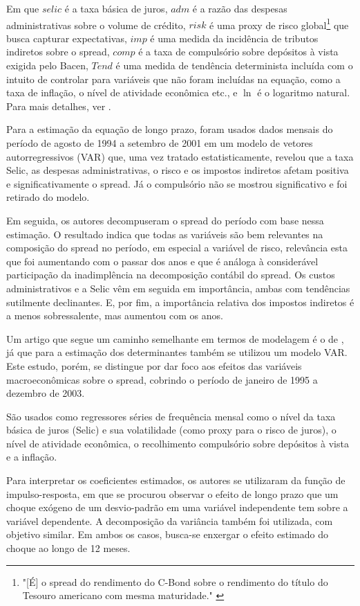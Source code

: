 \documentclass[a4paper,
               article,
               12pt,
               openany,
               oneside,
               english,
               brazil]{abntex2}
\numberwithin{equation}{section}
\begin{document}
    Em que $ selic $ é a taxa básica de juros, $ adm $ é a razão das despesas administrativas sobre o volume de crédito, $ risk $ é uma proxy de risco global\footnote{"[É] o spread do rendimento do C-Bond sobre o rendimento do título do Tesouro americano com mesma maturidade." \cite[p.~10]{nakane02}} que busca capturar expectativas, $ imp $ é uma medida da incidência de tributos indiretos sobre o spread, $ comp $ é a taxa de compulsório sobre depósitos à vista exigida pelo Bacen, $ Tend $ é uma medida de tendência determinista incluída com o intuito de controlar para variáveis que não foram incluídas na equação, como a taxa de inflação, o nível de atividade econômica etc., e $ \ln $ é o logaritmo natural. Para mais detalhes, ver \textcite[10]{nakane02}.

    Para a estimação da equação de longo prazo, foram usados dados mensais do período de agosto de 1994 a setembro de 2001 em um modelo de vetores autorregressivos (VAR) que, uma vez tratado estatisticamente, revelou que a taxa Selic, as despesas administrativas, o risco e os impostos indiretos afetam positiva e significativamente o spread. Já o compulsório não se mostrou significativo e foi retirado do modelo.

    Em seguida, os autores decompuseram o spread do período com base nessa estimação. O resultado indica que todas as variáveis são bem relevantes na composição do spread no período, em especial a variável de risco, relevância esta que foi aumentando com o passar dos anos e que é análoga à considerável participação da inadimplência na decomposição contábil do spread. Os custos administrativos e a Selic vêm em seguida em importância, ambas com tendências sutilmente declinantes. E, por fim, a importância relativa dos impostos indiretos é a menos sobressalente, mas aumentou com os anos. 

    Um artigo que segue um caminho semelhante em termos de modelagem é o de \textcite{oreiro}, já que para a estimação dos determinantes também se utilizou um modelo VAR\@. Este estudo, porém, se distingue por dar foco aos efeitos das variáveis macroeconômicas sobre o spread, cobrindo o período de janeiro de 1995 a dezembro de 2003. 
    
    São usados como regressores séries de frequência mensal como o nível da taxa básica de juros (Selic) e sua volatilidade (como proxy para o risco de juros), o nível de atividade econômica, o recolhimento compulsório sobre depósitos à vista e a inflação.

    Para interpretar os coeficientes estimados, os autores se utilizaram da função de impulso-resposta, em que se procurou observar o efeito de longo prazo que um choque exógeno de um desvio-padrão em uma variável independente tem sobre a variável dependente. A decomposição da variância também foi utilizada, com objetivo similar. Em ambos os casos, busca-se enxergar o efeito estimado do choque ao longo de 12 meses.
\end{document}
